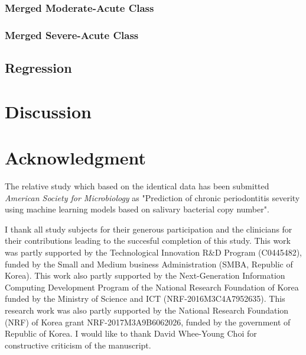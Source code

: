 \documentclass[aps, 11pt, a4paper]{article}
\begin{document}
    		\subsubsection{Merged Moderate-Acute Class}
    		
    		\subsubsection{Merged Severe-Acute Class}
    	
    	\subsection{Regression}
    
    \section{Discussion}
    
    \section{Acknowledgment}
    	The relative study which based on the identical data has been submitted \textit{American Society for Microbiology} as "Prediction of chronic periodontitis severity using machine learning models based on salivary bacterial copy number". 
    	
    	I thank all study subjects for their generous participation and the clinicians for their contributions leading to the succesful completion of this study. This work was partly supported by the Technological Innovation R\&D Program (C0445482), funded by the Small and Medium business Administration (SMBA, Republic of Korea). This work also partly supported by the Next-Generation Information Computing Development Program of the National Research Foundation of Korea funded by the Ministry of Science and ICT (NRF-2016M3C4A7952635). This research work was also partly supported by the National Research Foundation (NRF) of Korea grant NRF-2017M3A9B6062026, funded by the government of Republic of Korea. I would like to thank David Whee-Young Choi for constructive criticism of the manuscript. 
    
    
    
\end{document}
